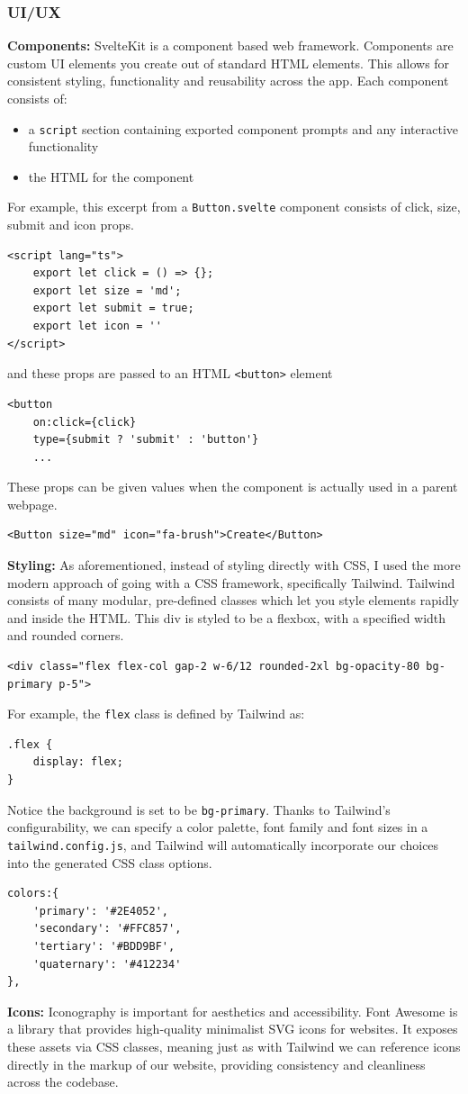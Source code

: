 \documentclass[12pt,a4paper]{article}
\begin{document}
\subsubsection{UI/UX}
\textbf{Components:} SvelteKit is a component based web framework. Components are custom UI elements you create out of standard HTML elements. This allows for consistent styling, functionality and reusability across the app. Each component consists of:
\begin{itemize}
    \item a \verb|script| section containing exported component prompts and any interactive functionality
    \item the HTML for the component
\end{itemize}
For example, this excerpt from a \verb|Button.svelte| component consists of click, size, submit and icon props. 
\begin{lstlisting}
<script lang="ts">
    export let click = () => {};
    export let size = 'md';
    export let submit = true;
    export let icon = ''
</script>
\end{lstlisting}
and these props are passed to an HTML \verb|<button>| element
\begin{lstlisting}
<button 
    on:click={click}
    type={submit ? 'submit' : 'button'}
    ...
\end{lstlisting}
These props can be given values when the component is actually used in a parent webpage.
\begin{lstlisting}
<Button size="md" icon="fa-brush">Create</Button>
\end{lstlisting}
\textbf{Styling:} As aforementioned, instead of styling directly with CSS, I used the more modern approach of going with a CSS framework, specifically Tailwind. Tailwind consists of many modular, pre-defined classes which let you style elements rapidly and inside the HTML. This div is styled to be a flexbox, with a specified width and rounded corners.
\begin{lstlisting}
<div class="flex flex-col gap-2 w-6/12 rounded-2xl bg-opacity-80 bg-primary p-5">
\end{lstlisting}
For example, the \verb|flex| class is defined by Tailwind as:
\begin{lstlisting}
.flex {
    display: flex;
}
\end{lstlisting}
Notice the background is set to be \verb|bg-primary|. Thanks to Tailwind's configurability, we can specify a color palette, font family and font sizes in a \verb|tailwind.config.js|, and Tailwind will automatically incorporate our choices into the generated CSS class options.
\begin{lstlisting}
colors:{
    'primary': '#2E4052',
    'secondary': '#FFC857',
    'tertiary': '#BDD9BF',
    'quaternary': '#412234'
},
\end{lstlisting}
\textbf{Icons:} Iconography is important for aesthetics and accessibility. Font Awesome is a library that provides high-quality minimalist SVG icons for websites. It exposes these assets via CSS classes, meaning just as with Tailwind we can reference icons directly in the markup of our website, providing consistency and cleanliness across the codebase. 
\end{document}
